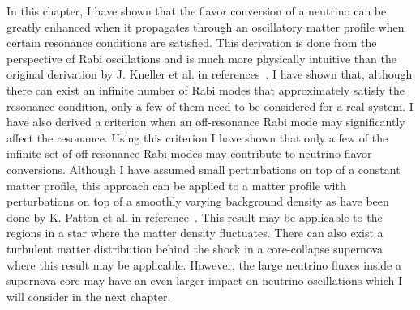 In this chapter, I have shown that the flavor conversion of a neutrino can be greatly enhanced when it propagates through an oscillatory matter profile when certain resonance conditions are satisfied. This derivation is done from the perspective of Rabi oscillations and is much more physically intuitive than the original derivation by J. Kneller et al. in references~\cite{Kneller2013, Patton2014}. I have shown that, although there can exist an infinite number of Rabi modes that approximately satisfy the resonance condition, only a few of them need to be considered for a real system. I have also derived a criterion when an off-resonance Rabi mode may significantly affect the resonance. Using this criterion I have shown that only a few of the infinite set of off-resonance Rabi modes may contribute to neutrino flavor conversions. Although I have assumed small perturbations on top of a constant matter profile, this approach can be applied to a matter profile with perturbations on top of a smoothly varying background density as have been done by K. Patton et al. in reference~\cite{Patton:2014lza}. This result may be applicable to the regions in a star where the matter density fluctuates. There can also exist a turbulent matter distribution behind the shock in a core-collapse supernova where this result may be applicable. However, the large neutrino fluxes inside a supernova core may have an even larger impact on neutrino oscillations which I will consider in the next chapter.


